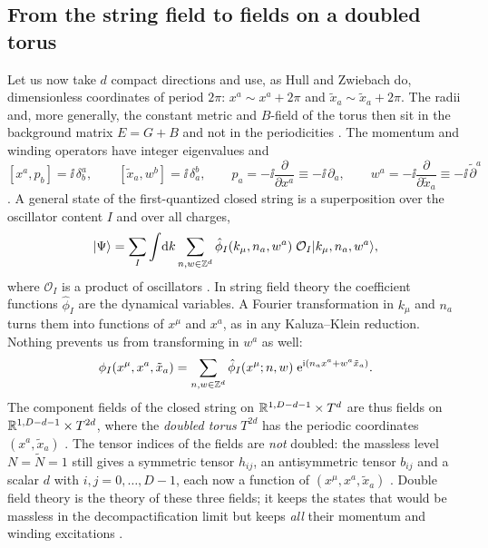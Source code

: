 \subsection{From the string field to fields on a doubled torus}

Let us now take $d$ compact directions and use, as Hull and Zwiebach do, dimensionless
coordinates of period $2\pi$: $x^a\sim x^a+2\pi$ and $\tilde x_a\sim\tilde x_a+2\pi$. The radii
and, more generally, the constant metric and $B$-field of the torus then sit in the background
matrix $E=G+B$ and not in the periodicities . The momentum and
winding operators have integer eigenvalues and
\begin{equation}\label{eq:doubled:ccr}
[x^a,p_b]=\ii\,\delta^a_b,\qquad [\tilde x_a,w^b]=\ii\,\delta_a^b,\qquad
p_a=-\ii\frac{\partial}{\partial x^a}\equiv-\ii\,\partial_a,\qquad
w^a=-\ii\frac{\partial}{\partial\tilde x_a}\equiv-\ii\,\tilde\partial^a
\end{equation}
. A general state of the first-quantized closed
string is a superposition over the oscillator content $I$ and over all charges,
\begin{equation}\label{eq:doubled:stringfield}
|\Psi\rangle=\sum_I\int\!\mathrm{d} k\sum_{n,w\in\mathbb{Z}^d}\hat\phi_I(k_\mu,n_a,w^a)\;
\mathcal O_I|k_\mu,n_a,w^a\rangle,
\end{equation}
where $\mathcal O_I$ is a product of oscillators . In
string field theory the coefficient functions $\hat\phi_I$ are the dynamical variables. A Fourier
transformation in $k_\mu$ and $n_a$ turns them into functions of $x^\mu$ and $x^a$, as in any
Kaluza--Klein reduction. Nothing prevents us from transforming in $w^a$ as well:
\begin{equation}\label{eq:doubled:fourier}
\phi_I(x^\mu,x^a,\tilde x_a)=\sum_{n,w\in\mathbb{Z}^d}\hat\phi_I(x^\mu;n,w)\;
\mathrm{e}^{\mathrm{i}(n_ax^a+w^a\tilde x_a)} .
\end{equation}
The component fields of the closed string on $\mathbb{R}^{1,D-d-1}\times T^d$ are thus fields on
$\mathbb{R}^{1,D-d-1}\times T^{2d}$, where the \emph{doubled torus} $T^{2d}$ has the
periodic coordinates $(x^a,\tilde x_a)$ . The tensor
indices of the fields are \emph{not} doubled: the massless level $N=\tilde N=1$ still gives a
symmetric tensor $h_{ij}$, an antisymmetric tensor $b_{ij}$ and a scalar $d$ with
$i,j=0,\dots,D-1$, each now a function of $(x^\mu,x^a,\tilde x_a)$ . Double field theory is the theory of these three
fields; it keeps the states that would be massless in the decompactification limit but keeps
\emph{all} their momentum and winding excitations .

